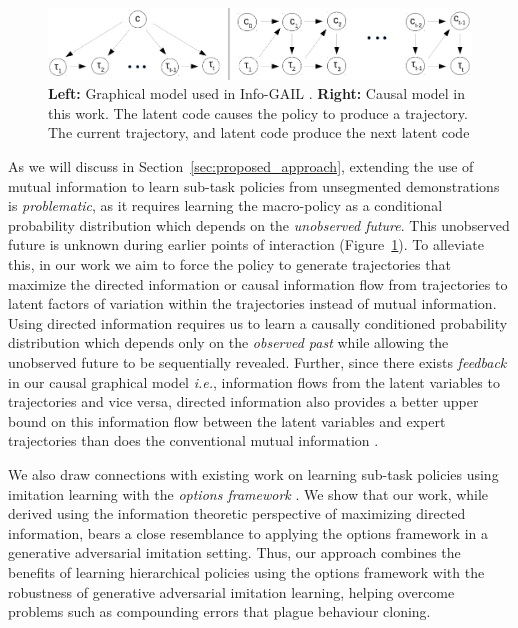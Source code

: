 \documentclass{article} %
\begin{document}
\begin{figure}
    \centering
    \includegraphics[scale=0.5]{figures/causal_model.pdf}
    \caption{\textbf{Left:} Graphical model used in Info-GAIL \cite{li2017infogail}. \textbf{Right:} Causal model in this work. The latent code causes the policy to produce a trajectory. The current trajectory, and latent code produce the next latent code}
    \label{fig:causal_model}
\end{figure}



As we will discuss in Section~\ref{sec:proposed_approach}, extending the use of mutual information
to learn sub-task policies from unsegmented demonstrations
is \textit{problematic}, as it requires learning the macro-policy as a conditional probability distribution which depends on the \emph{unobserved future}. This unobserved future is unknown during earlier points of interaction (Figure~\ref{fig:causal_model}).
To alleviate this, in our work we aim to force the policy to generate trajectories that maximize the directed information or causal information \citep{massey1990causality} flow from trajectories to latent factors of variation within the trajectories instead of mutual information. Using directed information requires us to learn a causally conditioned probability distribution \citep{kramer1998directed} which depends only on the \emph{observed past} while allowing the unobserved future to be sequentially revealed. Further, since there exists \emph{feedback} in our causal graphical model \emph{i.e.}, information flows from the latent variables to trajectories and vice versa, directed information also provides a better upper bound on this information flow between the latent variables and expert trajectories than does the conventional mutual information \citep{massey1990causality, kramer1998directed}.

We also draw connections with existing work on learning sub-task policies using imitation learning with the \textit{options framework} \citep{sutton1998intra, daniel2016probabilistic}. We show that our work, while derived using the information theoretic perspective of maximizing directed information, bears a close resemblance to applying the options framework in a generative adversarial imitation setting. Thus, our approach combines the benefits of learning hierarchical policies using the options framework with the robustness of generative adversarial imitation learning, helping overcome problems such as compounding errors that plague behaviour cloning.
\end{document}
